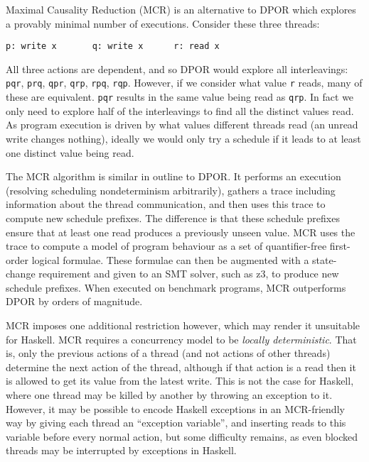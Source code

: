 Maximal Causality Reduction (MCR)\cite{huang2017,huang2015} is an alternative to
DPOR which explores a provably minimal number of executions.  Consider these
three threads:

\begin{center}
\verb|p: write x       q: write x      r: read x|
\end{center}

All three actions are dependent, and so DPOR would explore all interleavings:
\texttt{pqr}, \texttt{prq}, \texttt{qpr}, \texttt{qrp}, \texttt{rpq}, \texttt{rqp}.
However, if we consider what value \texttt{r} reads, many of these are
equivalent.  \texttt{pqr} results in the same value being read as \texttt{qrp}.
In fact we only need to explore half of the interleavings to find all the
distinct values read.  As program execution is driven by what values different
threads read (an unread write changes nothing), ideally we would only try a
schedule if it leads to at least one distinct value being read.

The MCR algorithm is similar in outline to DPOR\@.  It performs an execution
(resolving scheduling nondeterminism arbitrarily), gathers a trace including
information about the thread communication, and then uses this trace to compute
new schedule prefixes.  The difference is that these schedule prefixes ensure
that at least one read produces a previously unseen value.  MCR uses the trace
to compute a model of program behaviour as a set of quantifier-free first-order
logical formulae.  These formulae can then be augmented with a state-change
requirement and given to an SMT solver, such as z3, to produce new schedule
prefixes.  When executed on benchmark programs, MCR outperforms DPOR by orders
of magnitude\cite{huang2017}.

MCR imposes one additional restriction however, which may render it unsuitable
for Haskell.  MCR requires a concurrency model to be \emph{locally
deterministic}\cite{huang2015}.  That is, only the previous actions of a thread
(and not actions of other threads) determine the next action of the thread,
although if that action is a read then it is allowed to get its value from the
latest write.  This is not the case for Haskell, where one thread may be killed
by another by throwing an exception to it.  However, it may be possible to encode Haskell
exceptions in an MCR-friendly way by giving each thread an ``exception
variable'', and inserting reads to this variable before every normal action, but
some difficulty remains, as even blocked threads may be interrupted by
exceptions in Haskell.

